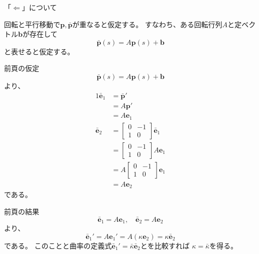 \documentclass[a4j,disablejfam,dvipdfmx,papersize,slide,uplatex,21pt]{jsarticle}
\makeatletter
\renewenvironment{proof}[1][\proofname]{\par
        \pushQED{\qed}
        \normalfont
        \topsep6\p@\@plus6\p@ \trivlist
        \item[\hskip\labelsep{\bfseries #1}\@addpunct{\bfseries}]\ignorespaces
    }{%
        \popQED\endtrivlist\@endpefalse
    }
\renewcommand{\proofname}{証明.}
\makeatother
\begin{document}
\begin{proof}
    「$\Leftarrow$」について

    回転と平行移動で$\bm{p}, \bar{\bm{p}}$が重なると仮定する。
    すなわち、ある回転行列$A$と定ベクトル$\bm{b}$が存在して
    \begin{equation}
        \bar{\bm{p}}(s) = A \bm{p}(s) + \bm{b}
    \end{equation}
    と表せると仮定する。

    \newpage
    前頁の仮定
    \begin{equation}
        \bar{\bm{p}}(s) = A \bm{p}(s) + \bm{b}
    \end{equation}
    より、
    \begin{alignat}{1}
        \bar{\bm{e}}_1 &= \bar{\bm{p}}' \\
            &= A \bm{p}' \\
            &= A \bm{e}_1 \\
        \bar{\bm{e}}_2
            &=
                \left[
                    \begin{array}{cc}
                        0 & -1 \\
                        1 & 0
                    \end{array}
                \right]
                \bar{\bm{e}}_1 \\
            &=
                \left[
                    \begin{array}{cc}
                        0 & -1 \\
                        1 & 0
                    \end{array}
                \right]
                A \bm{e}_1 \\
            &=
                A \left[
                    \begin{array}{cc}
                        0 & -1 \\
                        1 & 0
                    \end{array}
                \right]
                \bm{e}_1 \\
            &= A \bm{e}_2
    \end{alignat}
    である。

    \newpage
    前頁の結果
    \begin{equation}
        \bar{\bm{e}}_1 = A \bm{e}_1, \quad
        \bar{\bm{e}}_2 = A \bm{e}_2
    \end{equation}
    より、
    \begin{equation}
        \bar{\bm{e}}_1' = A \bm{e}_1' = A (\kappa \bm{e}_2) = \kappa \bar{\bm{e}}_2
    \end{equation}
    である。
    このことと曲率の定義式$\bar{\bm{e}}_1' = \bar{\kappa} \bar{\bm{e}}_2$とを比較すれば
    $\kappa = \bar{\kappa}$を得る。


\end{proof}
\end{document}
